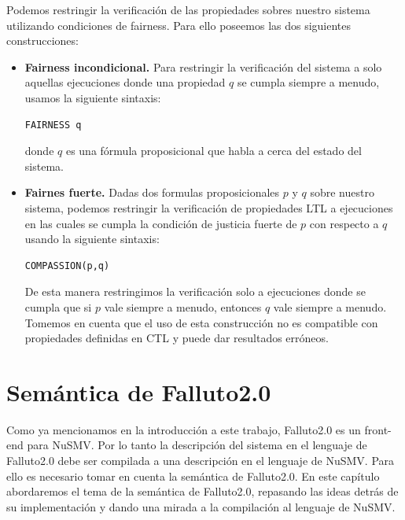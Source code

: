 \documentclass[titlepage, 12pt]{book}
\begin{document}
Podemos restringir la verificación de las propiedades sobres nuestro sistema utilizando condiciones de fairness. Para ello poseemos las dos siguientes construcciones:
\begin{itemize}
\item \textbf{Fairness incondicional.} Para restringir la verificación del sistema a solo aquellas ejecuciones donde una propiedad $q$ se cumpla siempre a menudo, usamos la siguiente sintaxis: \begin{verbatim}FAIRNESS q\end{verbatim} donde $q$ es una fórmula proposicional que habla a cerca del estado del sistema.
\item \textbf{Fairnes fuerte.} Dadas dos formulas proposicionales $p$ y $q$ sobre nuestro sistema, podemos restringir la verificación de propiedades LTL a ejecuciones en las cuales se cumpla la condición de justicia fuerte de $p$ con respecto a $q$ usando la siguiente sintaxis: \begin{verbatim}COMPASSION(p,q)\end{verbatim} De esta manera restringimos la verificación solo a ejecuciones donde se cumpla que si $p$ vale siempre a menudo, entonces $q$ vale siempre a menudo. Tomemos en cuenta que el uso de esta construcción no es compatible con propiedades definidas en CTL y puede dar resultados erróneos.
\end{itemize}



\chapter{Semántica de Falluto2.0}
Como ya mencionamos en la introducción a este trabajo, Falluto2.0 es un front-end para NuSMV. Por lo tanto la descripción del sistema en el lenguaje de Falluto2.0 debe ser compilada a una descripción en el lenguaje de NuSMV. Para ello es necesario tomar en cuenta la semántica de Falluto2.0. En este capítulo abordaremos el tema de la semántica de Falluto2.0, repasando las ideas detrás de su implementación y dando una mirada a la compilación al lenguaje de NuSMV.
\end{document}
